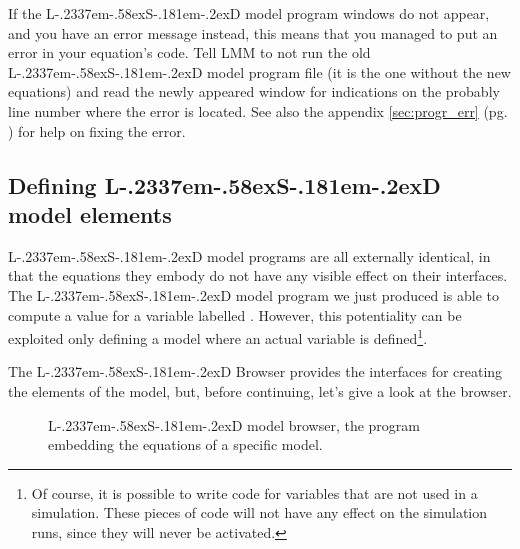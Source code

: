 \documentclass [11pt,a4paper] {book}
\def\LsD{{L\kern-.2337em\lower-.58ex\hbox{S}\kern-.181em\lower-.2ex\hbox{D}}\xspace}
\begin{document}
If the \LsD model program windows do not appear, and you have an error message instead, this means that you managed to put an error in your equation's code. Tell LMM to not run the old \LsD model program file (it is the one without the new equations) and read the newly appeared window for indications on the probably line number where the error is located. See also the appendix \ref{sec:progr_err} (pg.
\pageref{sec:progr_err}) for help on fixing the error.

\subsection{Defining \LsD model elements}

\LsD model programs are all externally identical, in that the equations they embody do not have any visible effect on their interfaces. The  \LsD model program we just produced is able to compute a value for a variable labelled . However, this potentiality can be exploited only defining a model where an actual variable  is defined\footnote{Of course, it is possible to write code for variables that are not used in a simulation. These pieces of code will not have any effect on the simulation runs, since they will never be activated.}.


The \LsD Browser provides the interfaces for creating the elements of the model, but, before continuing, let's give a look at the browser.

\begin{figure}[ht]
  \centering
  \caption{\LsD model browser, the program embedding the equations of a specific model.}
  \label{fig:lsdbrowser}
\end{figure}
\end{document}
